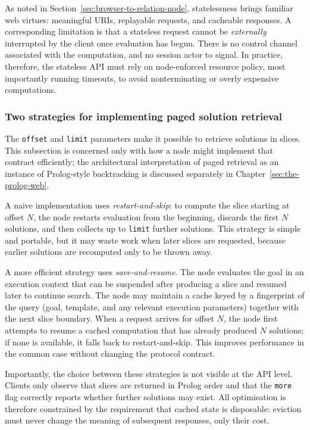 As noted in Section~\ref{sec:browser-to-relation-node}, statelessness brings familiar web virtues: meaningful URIs, replayable requests, and cacheable responses. A corresponding limitation is that a stateless request cannot be \emph{externally} interrupted by the client once evaluation has begun. There is no control channel associated with the computation, and no session actor to signal. In practice, therefore, the stateless API must rely on node-enforced resource policy, most importantly running timeouts, to avoid nonterminating or overly expensive computations.

\subsubsection{Two strategies for implementing paged solution retrieval}\label{sec:two-strategies-paged-solution-retrieval}

The \texttt{offset} and \texttt{limit} parameters make it possible to retrieve solutions in slices. This subsection is concerned only with how a node might implement that contract efficiently; the architectural interpretation of paged retrieval as an instance of Prolog-style backtracking is discussed separately in Chapter~\ref{sec:the-prolog-web}.

A naive implementation uses \emph{restart-and-skip}: to compute the slice starting at offset $N$, the node restarts evaluation from the beginning, discards the first $N$ solutions, and then collects up to \texttt{limit} further solutions. This strategy is simple and portable, but it may waste work when later slices are requested, because earlier solutions are recomputed only to be thrown away.

A more efficient strategy uses \emph{save-and-resume}. The node evaluates the goal in an execution context that can be suspended after producing a slice and resumed later to continue search. The node may maintain a cache keyed by a fingerprint of the query (goal, template, and any relevant execution parameters) together with the next slice boundary. When a request arrives for offset $N$, the node first attempts to resume a cached computation that has already produced $N$ solutions; if none is available, it falls back to restart-and-skip. This improves performance in the common case without changing the protocol contract.

Importantly, the choice between these strategies is not visible at the API level. Clients only observe that slices are returned in Prolog order and that the \texttt{more} flag correctly reports whether further solutions may exist. All optimisation is therefore constrained by the requirement that cached state is disposable: eviction must never change the meaning of subsequent responses, only their cost.


